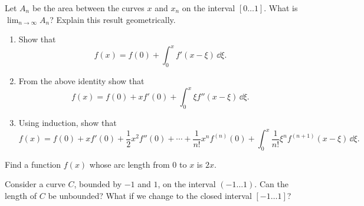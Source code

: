 \begin{Exercise}
  \label{exercise area x xn}
  Let $A_n$ be the area between the curves $x$ and $x_n$ on the interval
  $[0 \ldots 1]$.  What is $\lim_{n \to \infty} A_n$?  Explain this result geometrically.

\end{Exercise}




\begin{Exercise}
  \label{exercise taylor series integral}
  \renewcommand{\theenumi}{\alph{enumi}}
  \begin{enumerate}
  \item
    Show that
    \[
    f(x) = f(0) + \int_0^x f'(x-\xi)\,\dd \xi.
    \]
  \item
    From the above identity show that
    \[
    f(x) = f(0) + x f'(0) + \int_0^x \xi f''(x-\xi)\,\dd \xi.
    \]
  \item
    Using induction, show that
    \[
    f(x) = f(0) + x f'(0) + \frac{1}{2} x^2 f''(0) + \cdots +
    \frac{1}{n!} x^n f^{(n)}(0)
    + \int_0^x \frac{1}{n!} \xi^n  f^{(n+1)}(x-\xi)\,\dd \xi.
    \]
  \end{enumerate}
  \renewcommand{\theenumi}{\arabic{enumi}}

\end{Exercise}



\begin{Exercise}
  \label{exercise arclength 0 x 2x}
  Find a function $f(x)$ whose arc length from $0$ to $x$ is $2 x$.

\end{Exercise}








\begin{Exercise}
  \label{exercise bounded -1 1 length}
  Consider a curve $C$, bounded by $-1$ and $1$, on the interval
  $(-1 \ldots 1)$.  Can the length of $C$ be unbounded?  What if we change
  to the closed interval $[-1 \ldots 1]$?

\end{Exercise}








